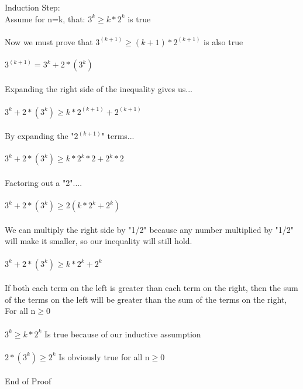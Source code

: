 \documentclass{article}
\begin{document}
Induction Step:\\
Assume for n=k, that: $3^k \geq k*2^k$ is true\\ \\
Now we must prove that $3^{(k+1)} \geq (k+1)*2^{(k+1)}$ is also true\\ \\
$3^{(k+1)} = 3^k + 2*(3^k)$\\ \\
Expanding the right side of the inequality gives us...\\ \\ 
$3^k + 2*(3^k) \geq k*2^{(k+1)} + 2^{(k+1)}$ \\ \\ 
By expanding the "$2^{(k+1)}$" terms...\\ \\ 
$3^k + 2*(3^k) \geq k*2^k * 2 + 2^k * 2$\\ \\ 
Factoring out a "2"....\\ \\ 
$3^k + 2*(3^k) \geq 2(k*2^k + 2^k)$\\ \\ 
We can multiply the right side by "1/2" because any number multiplied by "1/2" will make it smaller, so our inequality will still hold.\\ \\
$3^k + 2*(3^k) \geq k*2^k + 2^k$\\ \\
If both each term on the left is greater than each term on the right, then the sum of the terms on the left will be greater than the sum of the terms on the right, For all n$\geq$0\\ \\
$3^k \geq k*2^k$ Is true because of our inductive assumption\\ \\
$2*(3^k) \geq 2^k$ Is obviously true for all n$\geq$0\\ \\
End of Proof\\ \\ \\ \\






\end{document}

